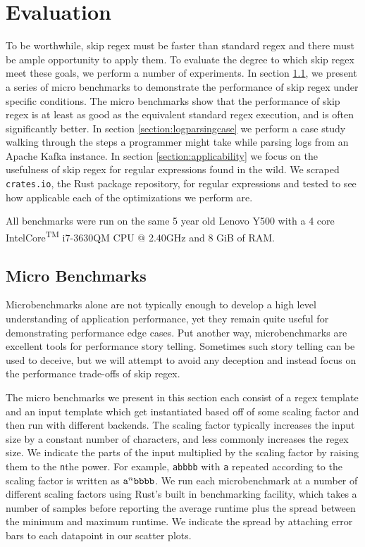 \chapter{Evaluation}
\label{chapter:evaluation}

To be worthwhile, skip regex must be faster than standard
regex and there must be ample opportunity to apply them. To evaluate
the degree to which skip regex meet these goals, we perform a number
of experiments. In section \ref{section:microbenchmarks}, we present a
series of micro benchmarks to demonstrate
the performance of skip regex under specific conditions. The micro
benchmarks show that the performance of skip regex is
at least as good as the equivalent standard regex execution, and 
is often significantly better.
In section \ref{section:logparsingcase} we perform a case study walking
through the steps a programmer might take while parsing logs from
an Apache Kafka instance.
In section \ref{section:applicability} we focus on the usefulness of
skip regex for regular expressions found in the wild. We scraped
\verb'crates.io', the Rust package repository,
for regular expressions and tested to see how applicable each of the 
optimizations we perform are. 

All benchmarks were run on the same 5 year old Lenovo Y500 with a 4 core
Intel\textregistered Core\textsuperscript{TM} i7-3630QM CPU @
2.40GHz and 8 GiB of RAM.

\section{Micro Benchmarks}
\label{section:microbenchmarks}

Microbenchmarks alone are not typically enough to develop a high
level understanding of application performance, yet they remain
quite useful for demonstrating performance edge cases. Put another
way, microbenchmarks are excellent tools for performance story
telling. Sometimes such story telling can be used to deceive,
but we will attempt to avoid any deception and instead focus
on the performance trade-offs of skip regex.

The micro benchmarks we present in this section each consist of
a regex template and an input template which get instantiated
based off of some scaling factor and then run with different
backends. The scaling factor typically increases the input
size by a constant number of characters, and less commonly
increases the regex size. We indicate the parts of the
input multiplied by the scaling factor by raising them
to the \verb'n'the power. For example, \verb'abbbb' with \verb'a'
repeated according to the scaling factor is written as
${\tt a}^n{\tt bbbb}$. We run each microbenchmark at a
number of different scaling factors using Rust's built in
benchmarking facility, which takes a number of samples before
reporting the average runtime plus the spread between the minimum
and maximum runtime. We indicate the spread by attaching error bars to
each datapoint in our scatter plots.

